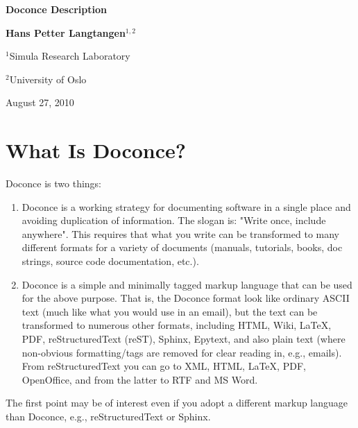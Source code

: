 \documentclass{article}
\begin{document}





\begin{center}
{\LARGE\bf Doconce Description}
\end{center}



\begin{center}
{\bf Hans Petter Langtangen${}^{1, 2}$} \\ [0mm]
\end{center}

\begin{center}
{\small ${}^1$Simula Research Laboratory} \\ [-1.0mm]
\end{center}

\begin{center}
{\small ${}^2$University of Oslo} \\ [-1.0mm]
\end{center}





\begin{center}
August 27, 2010
\end{center}




\section{What Is Doconce?}

\label{what:is:doconce}

Doconce is two things:

\begin{enumerate}
 \item Doconce is a working strategy for documenting software in a single
    place and avoiding duplication of information. The slogan is:
    "Write once, include anywhere". This requires that what you write
    can be transformed to many different formats for a variety of
    documents (manuals, tutorials, books, doc strings, source code
    documentation, etc.).
 \item Doconce is a simple and minimally tagged markup language that can
    be used for the above purpose. That is, the Doconce format look
    like ordinary ASCII text (much like what you would use in an
    email), but the text can be transformed to numerous other formats,
    including HTML, Wiki, {\LaTeX}, PDF, reStructuredText (reST), Sphinx,
    Epytext, and also plain text (where non-obvious formatting/tags are
    removed for clear reading in, e.g., emails). From reStructuredText
    you can go to XML, HTML, {\LaTeX}, PDF, OpenOffice, and from the
    latter to RTF and MS Word.
\end{enumerate}
The first point may be of interest even if you adopt a different
markup language than Doconce, e.g., reStructuredText or Sphinx.
\end{document}
